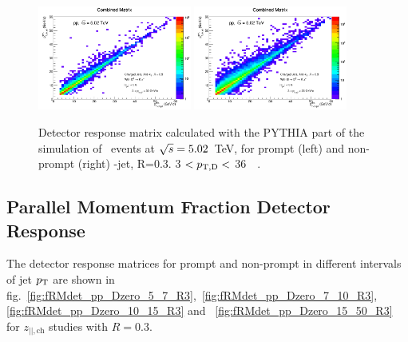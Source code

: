 \begin{figure}[bth]
\centering
\includegraphics[width=0.45\textwidth]{pPbcuts_2sig/ProdMatrix}
\includegraphics[width=0.45\textwidth]{pPbcuts_2sig/ProdMatrixFD}
\caption{Detector response matrix calculated with the PYTHIA part of the simulation of \pp\ events at $\sqrt{s}=5.02$~TeV, for prompt (left) and non-prompt (right) \Dzero-jet, R=0.3. 3 $< p_{\mathrm{T,D}} < $ 36~\GeVc\ .}
\label{fig:fRMdet_pPb_Dzero}
\end{figure}


\subsection{Parallel Momentum Fraction Detector Response}
The detector response matrices for prompt and non-prompt in different intervals of jet $p_{\text T}$ are shown in 
fig.~\ref{fig:fRMdet_pp_Dzero_5_7_R3},~\ref{fig:fRMdet_pp_Dzero_7_10_R3},~
\ref{fig:fRMdet_pp_Dzero_10_15_R3} and ~\ref{fig:fRMdet_pp_Dzero_15_50_R3} for $z_{||,\text{ch}}$ studies with $R=0.3$. 


